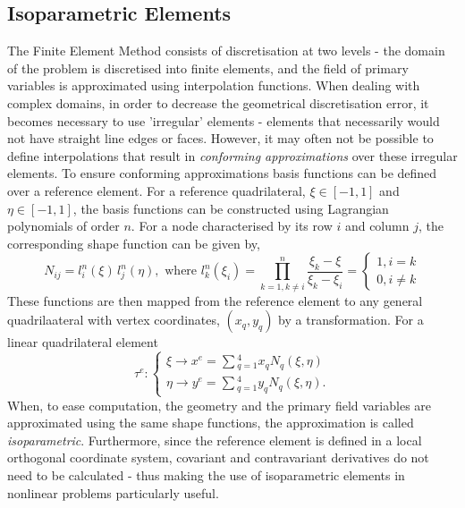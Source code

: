 \documentclass[../main.tex]{subfiles}
\begin{document}
\subsection{Isoparametric Elements} \label{sec:isoparametric_theory}
The Finite Element Method consists of discretisation at two levels - the domain of the problem is discretised into finite elements, and the field of primary variables
 is approximated using interpolation functions. When dealing with complex domains, in order to decrease the geometrical discretisation error, it becomes necessary to
 use 'irregular' elements - elements that necessarily would not have straight line edges or faces.
 However, it may often not be possible to define interpolations that result in \emph{conforming approximations} over these irregular elements. 
To ensure conforming approximations basis functions can be defined over a reference element. For a reference quadrilateral,
 $\xi \in [-1,1]$ and $\eta \in [-1, 1]$, the basis functions can be constructed using Lagrangian polynomials of order $n$.
 For a node characterised by its row $i$ and column $j$, the corresponding shape function can be given by,
 \begin{equation}
    N_{ij} = l^{n}_{i}(\xi) \, l^{n}_{j}(\eta), \text{ where } l^{n}_{k}(\xi_{i}) = \prod^{n}_{k = 1, k \neq i} \frac{\xi_{k} - \xi}{\xi_{k} - \xi_{i}} = \begin{cases} 
        1, i = k \\
        0, i \neq k
    \end{cases}
\end{equation} 
These functions are then mapped from the reference element to any general quadrilaateral with vertex coordinates, $(x_{q}, y_{q})$ by a transformation. For a linear
 quadrilateral element 
\begin{equation}
    \tau^{e}: \begin{cases}
        \xi \rightarrow x^{e} = \sum \limits{^{4}_{q=1}} x_{q} N_{q}(\xi, \eta)\\
        \eta \rightarrow y^{e} = \sum \limits{^{4}_{q=1}} y_{q} N_{q}(\xi, \eta).
    \end{cases}
\end{equation}
When, to ease computation, the geometry and the primary field variables are approximated using the same shape functions, the approximation is called \emph{isoparametric}.
Furthermore, since the reference element is defined in a local orthogonal coordinate system, covariant and contravariant derivatives do not need to be
 calculated - thus making the use of isoparametric elements in nonlinear problems particularly useful.
\end{document}
